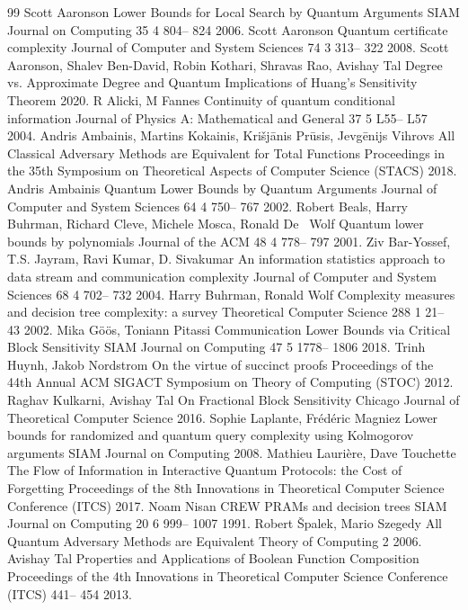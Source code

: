 \documentclass[10pt,a4paper]{article}
\theoremstyle{definition}
\renewcommand{\>}{\rangle}
\newcommand{\<}{\langle}
\begin{document}
\begin{thebibliography}{99}
 Scott Aaronson Lower Bounds for Local Search by Quantum Arguments {SIAM} Journal on Computing 35 4 804-- 824 2006.
 Scott Aaronson Quantum certificate complexity Journal of Computer and System Sciences 74 3 313-- 322 2008.
 Scott Aaronson, Shalev Ben-David, Robin Kothari, Shravas Rao, Avishay Tal Degree vs. Approximate Degree and Quantum Implications of Huang's Sensitivity Theorem 2020.
 R Alicki, M Fannes Continuity of quantum conditional information Journal of Physics A: Mathematical and General 37 5 L55-- L57 2004.
 Andris Ambainis, Martins Kokainis, Kri{š}j{ā}nis Pr{ū}sis, Jevg{ē}nijs Vihrovs All Classical Adversary Methods are Equivalent for Total Functions Proceedings in the 35th Symposium on Theoretical Aspects of Computer Science ({STACS}) 2018.
 Andris Ambainis Quantum Lower Bounds by Quantum Arguments Journal of Computer and System Sciences 64 4 750-- 767 2002.
 Robert Beals, Harry Buhrman, Richard Cleve, Michele Mosca, Ronald De~ Wolf Quantum lower bounds by polynomials Journal of the {ACM} 48 4 778-- 797 2001.
 Ziv Bar-Yossef, T.S. Jayram, Ravi Kumar, D. Sivakumar An information statistics approach to data stream and communication complexity Journal of Computer and System Sciences 68 4 702-- 732 2004.
 Harry Buhrman, Ronald Wolf Complexity measures and decision tree complexity: a survey Theoretical Computer Science 288 1 21-- 43 2002.
 Mika Göös, Toniann Pitassi Communication Lower Bounds via Critical Block Sensitivity {SIAM} Journal on Computing 47 5 1778-- 1806 2018.
 Trinh Huynh, Jakob Nordstrom On the virtue of succinct proofs Proceedings of the 44th Annual {ACM} {SIGACT} Symposium on Theory of Computing ({STOC}) 2012.
 Raghav Kulkarni, Avishay Tal On Fractional Block Sensitivity Chicago Journal of Theoretical Computer Science 2016.
 Sophie Laplante, Frédéric Magniez Lower bounds for randomized and quantum query complexity using {K}olmogorov arguments {SIAM} Journal on Computing 2008.
 Mathieu Laurière, Dave Touchette The Flow of Information in Interactive Quantum Protocols: the Cost of Forgetting Proceedings of the 8th Innovations in Theoretical Computer Science Conference ({ITCS}) 2017.
 Noam Nisan CREW PRAMs and decision trees {SIAM} Journal on Computing 20 6 999-- 1007 1991.
 Robert {Š}palek, Mario Szegedy All Quantum Adversary Methods are Equivalent Theory of Computing 2 2006.
 Avishay Tal Properties and Applications of Boolean Function Composition Proceedings of the 4th Innovations in Theoretical Computer Science Conference ({ITCS}) 441-- 454 2013.
\end{thebibliography}
\end{document}
